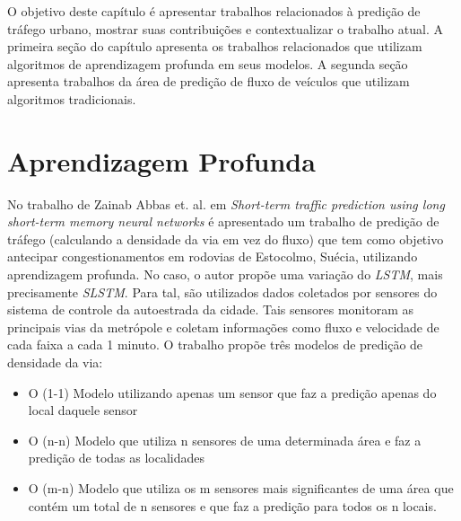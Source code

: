 


\label{chapter:trabalhos_relacionados}

O objetivo deste capítulo é apresentar trabalhos relacionados à predição de tráfego urbano, mostrar suas contribuições e contextualizar o trabalho atual. A primeira seção do capítulo apresenta os trabalhos relacionados que utilizam algoritmos de aprendizagem profunda em seus modelos. A segunda seção apresenta trabalhos da área de predição de fluxo de veículos que utilizam algoritmos tradicionais.

\section{Aprendizagem Profunda}

No trabalho de Zainab Abbas et. al. em \textit{Short-term traffic prediction using long short-term memory neural networks} \cite{Zainab_2018} é apresentado um trabalho de predição de tráfego (calculando a densidade da via em vez do fluxo) que tem como objetivo antecipar congestionamentos em rodovias de Estocolmo, Suécia, utilizando aprendizagem profunda. No caso, o autor propõe uma variação do \textit{\acrshort{LSTM}}, mais precisamente \textit{\acrfull{SLSTM}}. Para tal, são utilizados dados coletados por sensores do sistema de controle da autoestrada da cidade. Tais sensores monitoram as principais vias da metrópole e coletam informações como fluxo e velocidade de cada faixa a cada 1 minuto. O trabalho propõe três modelos de predição de densidade da via:
 
\begin{itemize}
    \item O (1-1) Modelo utilizando apenas um sensor que faz a predição apenas do local daquele sensor
    \item O (n-n) Modelo que utiliza n sensores de uma determinada área e faz a predição de todas as localidades
    \item O (m-n) Modelo que utiliza os m sensores mais significantes de uma área que contém um total de n sensores e que faz a predição para todos os n locais.
\end{itemize}

